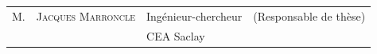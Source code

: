 \begin{titlepage}
\begin{textblock}{14}
\begin{center}
\begin{tabular}{llll}
				M.    & \textsc{Jacques Marroncle}   & Ingénieur-chercheur     & (Responsable de thèse) \\
				\null & \null                        & CEA Saclay              &                        \\ 		
			\end{tabular}
		\end{center}
	\end{textblock}
\end{titlepage}